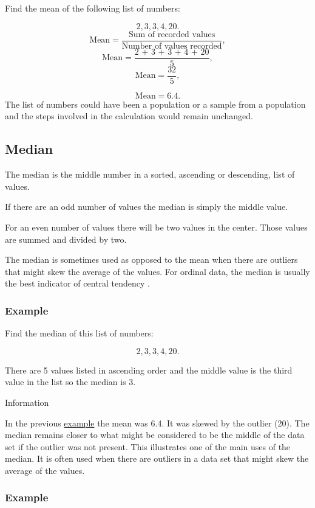 \documentclass[
]{book}
\begin{document}
Find the mean of the following list of numbers:

\[ 2, 3, 3, 4, 20.\]
\[ \textrm{Mean} = \frac{\textrm{Sum of recorded values}}{\textrm{Number of values recorded}},\]
\[ \textrm{Mean} = \frac{\textrm{2 + 3 + 3 + 4 + 20}}{\textrm{5}},\]
\[ \textrm{Mean} = \frac{\textrm{32}}{\textrm{5}},\]

\[ \textrm{Mean} = 6.4.\]
The list of numbers could have been a population or a sample from a population and the steps involved in the calculation would remain unchanged.

\hypertarget{median}{%
\subsection{Median}\label{median}}

The median is the middle number in a sorted, ascending or descending, list of values.

If there are an odd number of values the median is simply the middle value.

For an even number of values there will be two values in the center. Those values are summed and divided by two.

The median is sometimes used as opposed to the mean when there are outliers that might skew the average of the values. For ordinal data, the median is usually the best indicator of central tendency \citep{mchugh3}.

\hypertarget{example-1}{%
\subsubsection{Example}\label{example-1}}

Find the median of this list of numbers:

\[ 2, 3, 3, 4, 20.\]

There are 5 values listed in ascending order and the middle value is the third value in the list so the median is 3.

Information

In the previous \protect\hyperlink{firstexamp}{example} the mean was 6.4. It was skewed by the outlier (20). The median remains closer to what might be considered to be the middle of the data set if the outlier was not present. This illustrates one of the main uses of the median. It is often used when there are outliers in a data set that might skew the average of the values.

\hypertarget{example-2}{%
\subsubsection{Example}\label{example-2}}
\end{document}
